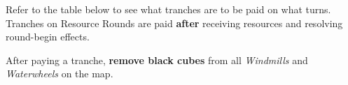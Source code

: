 \begin{multicols*}{2}
Refer to the table below to see what tranches are to be paid on what turns. Tranches on Resource Rounds are paid \textbf{after} receiving resources and resolving round-begin effects.

After paying a tranche, \textbf{remove black cubes} from all \textit{Windmills} and \textit{Waterwheels} on the map.


\end{multicols*}
